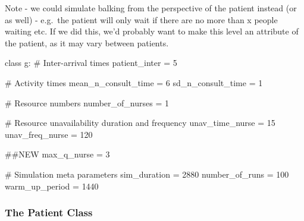 \documentclass[
  letterpaper,
  DIV=11,
  numbers=noendperiod]{scrreprt}
\newenvironment{Shaded}{\begin{snugshade}}{\end{snugshade}}
\newcommand{\CommentTok}[1]{\textcolor[rgb]{0.37,0.37,0.37}{#1}}
\newcommand{\DecValTok}[1]{\textcolor[rgb]{0.68,0.00,0.00}{#1}}
\newcommand{\KeywordTok}[1]{\textcolor[rgb]{0.00,0.23,0.31}{#1}}
\newcommand{\NormalTok}[1]{\textcolor[rgb]{0.00,0.23,0.31}{#1}}
\newcommand{\OperatorTok}[1]{\textcolor[rgb]{0.37,0.37,0.37}{#1}}
\begin{document}
\begin{tcolorbox}[enhanced jigsaw, rightrule=.15mm, colback=white, colframe=quarto-callout-note-color-frame, colbacktitle=quarto-callout-note-color!10!white, toprule=.15mm, coltitle=black, opacityback=0, titlerule=0mm, bottomtitle=1mm, breakable, title=\textcolor{quarto-callout-note-color}{\faInfo}\hspace{0.5em}{Note}, opacitybacktitle=0.6, toptitle=1mm, arc=.35mm, bottomrule=.15mm, leftrule=.75mm, left=2mm]

Note - we could simulate balking from the perspective of the patient
instead (or as well) - e.g.~the patient will only wait if there are no
more than x people waiting etc. If we did this, we'd probably want to
make this level an attribute of the patient, as it may vary between
patients.

\end{tcolorbox}

\begin{Shaded}
\begin{Highlighting}[]
\KeywordTok{class}\NormalTok{ g:}
    \CommentTok{\# Inter{-}arrival times}
\NormalTok{    patient\_inter }\OperatorTok{=} \DecValTok{5}

    \CommentTok{\# Activity times}
\NormalTok{    mean\_n\_consult\_time }\OperatorTok{=} \DecValTok{6}
\NormalTok{    sd\_n\_consult\_time }\OperatorTok{=} \DecValTok{1}

    \CommentTok{\# Resource numbers}
\NormalTok{    number\_of\_nurses }\OperatorTok{=} \DecValTok{1}

    \CommentTok{\# Resource unavailability duration and frequency}
\NormalTok{    unav\_time\_nurse }\OperatorTok{=} \DecValTok{15}
\NormalTok{    unav\_freq\_nurse }\OperatorTok{=} \DecValTok{120}

    \CommentTok{\#\#NEW}
\NormalTok{    max\_q\_nurse }\OperatorTok{=} \DecValTok{3}

    \CommentTok{\# Simulation meta parameters}
\NormalTok{    sim\_duration }\OperatorTok{=} \DecValTok{2880}
\NormalTok{    number\_of\_runs }\OperatorTok{=} \DecValTok{100}
\NormalTok{    warm\_up\_period }\OperatorTok{=} \DecValTok{1440}
\end{Highlighting}
\end{Shaded}

\subsubsection{The Patient Class}\label{the-patient-class-5}
\end{document}
